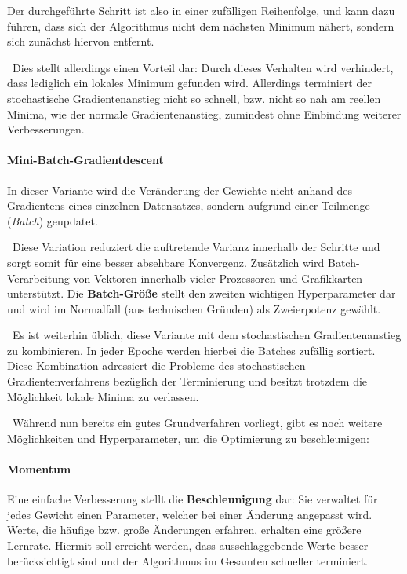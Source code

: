 Der durchgeführte Schritt ist also in einer zufälligen Reihenfolge, und kann dazu führen, dass sich der Algorithmus nicht dem nächsten Minimum nähert, sondern sich zunächst hiervon entfernt. 

~\newline Dies stellt allerdings einen Vorteil dar: Durch dieses Verhalten wird verhindert, dass lediglich ein lokales Minimum gefunden wird. Allerdings terminiert der stochastische Gradientenanstieg nicht so schnell, bzw. nicht so nah am reellen Minima, wie der normale Gradientenanstieg, zumindest ohne Einbindung weiterer Verbesserungen.

\paragraph{Mini-Batch-Gradientdescent} In dieser Variante wird die Veränderung der Gewichte nicht anhand des Gradientens eines einzelnen Datensatzes, sondern aufgrund einer Teilmenge (\textit{Batch}) geupdatet. 

~\newline Diese Variation reduziert die auftretende Varianz innerhalb der Schritte und sorgt somit für eine besser absehbare Konvergenz. Zusätzlich wird Batch-Verarbeitung von Vektoren innerhalb vieler Prozessoren und Grafikkarten unterstützt. Die \textbf{Batch-Größe} stellt den zweiten wichtigen Hyperparameter dar und wird im Normalfall (aus technischen Gründen) als Zweierpotenz gewählt.   

~\newline Es ist weiterhin üblich, diese Variante mit dem stochastischen Gradientenanstieg zu kombinieren. In jeder Epoche werden hierbei die Batches zufällig sortiert. Diese Kombination adressiert die Probleme des stochastischen Gradientenverfahrens bezüglich der Terminierung und besitzt trotzdem die Möglichkeit lokale Minima zu verlassen.  

~\newline Während nun bereits ein gutes Grundverfahren vorliegt, gibt es noch weitere Möglichkeiten und Hyperparameter, um die Optimierung zu beschleunigen:

\paragraph{Momentum} Eine einfache Verbesserung stellt die \textbf{Beschleunigung} dar: Sie verwaltet für jedes Gewicht einen Parameter, welcher bei einer Änderung angepasst wird. Werte, die häufige bzw. große Änderungen erfahren, erhalten eine größere Lernrate. Hiermit soll erreicht werden, dass ausschlaggebende Werte besser berücksichtigt sind und der Algorithmus im Gesamten schneller terminiert. 

